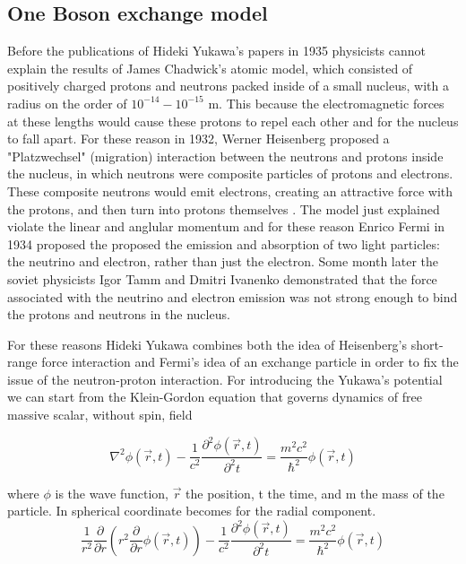 \documentclass[12pt,a4paper]{book}
\begin{document}
	\subsection{One Boson exchange model}
	Before the publications of Hideki Yukawa's papers in 1935 \cite{yukawa} physicists cannot explain the results of James Chadwick's atomic model, which consisted of positively charged protons and neutrons packed inside of a small nucleus, with a radius on the order of $10^{-14}-10^{-15}$ m. This because the electromagnetic forces at these lengths would cause these protons to repel each other and for the nucleus to fall apart. For these reason in 1932, Werner Heisenberg proposed a "Platzwechsel" (migration) interaction between the neutrons and protons inside the nucleus, in which neutrons were composite particles of protons and electrons. These composite neutrons would emit electrons, creating an attractive force with the protons, and then turn into protons themselves \cite{heisemerg}. The model just explained violate the linear and anglular momentum and for these reason Enrico Fermi in 1934 proposed the  proposed the emission and absorption of two light particles: the neutrino and electron, rather than just the electron. Some month later the soviet physicists Igor Tamm and Dmitri Ivanenko demonstrated that the force associated with the neutrino and electron emission was not strong enough to bind the protons and neutrons in the nucleus.
	
	For these reasons Hideki Yukawa combines both the idea of Heisenberg's short-range force interaction and Fermi's idea of an exchange particle in order to fix the issue of the neutron-proton interaction. For introducing the Yukawa's potential we can start from the Klein-Gordon equation that governs dynamics of free massive scalar, without spin, field
	
	\begin{equation}
		\nabla^2 \phi(\vec{r},t) - \frac{1}{c^2} \frac{\partial^2 \phi(\vec{r},t)}{\partial^2 t} = \frac{m^2 c^2}{\hbar^2} \phi(\vec{r},t)
		\label{eq:klein-gordon}
	\end{equation}
	
	where $\phi$ is the wave function, $\vec{r}$ the position, t the time, and m the mass of the particle. In spherical coordinate becomes for the radial component.
	\begin{equation}
		\frac{1}{r^2} \frac{\partial}{\partial r} (r^2 \frac{\partial}{\partial r} \phi(\vec{r},t)) - \frac{1}{c^2} \frac{\partial^2 \phi(\vec{r},t)}{\partial^2 t} = \frac{m^2 c^2}{\hbar^2} \phi(\vec{r},t)
		\label{eq:klein-gordon-spjericaò}
	\end{equation}
	
\end{document}
